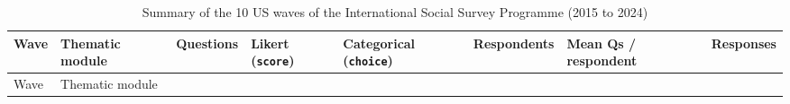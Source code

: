 \documentclass[
  11pt,
  letterpaper,
]{article}
\begin{document}
{\def\LTcaptype{apptbl}
\begin{longtable}[]{@{}
  >{\raggedright\arraybackslash}p{}
  >{\raggedright\arraybackslash}p{}
  >{\raggedleft\arraybackslash}p{}
  >{\raggedleft\arraybackslash}p{}
  >{\raggedleft\arraybackslash}p{}
  >{\raggedleft\arraybackslash}p{}
  >{\raggedleft\arraybackslash}p{}
  >{\raggedleft\arraybackslash}p{}@{}}
\caption{{\label{apptbl-issp-waves}}Summary of the 10 US waves of the
International Social Survey Programme (2015 to 2024)}\tabularnewline
\toprule\noalign{}
\begin{minipage}[b]{\linewidth}\raggedright
Wave
\end{minipage} & \begin{minipage}[b]{\linewidth}\raggedright
Thematic module
\end{minipage} & \begin{minipage}[b]{\linewidth}\raggedleft
Questions
\end{minipage} & \begin{minipage}[b]{\linewidth}\raggedleft
Likert (\texttt{score})
\end{minipage} & \begin{minipage}[b]{\linewidth}\raggedleft
Categorical (\texttt{choice})
\end{minipage} & \begin{minipage}[b]{\linewidth}\raggedleft
Respondents
\end{minipage} & \begin{minipage}[b]{\linewidth}\raggedleft
Mean Qs / respondent
\end{minipage} & \begin{minipage}[b]{\linewidth}\raggedleft
Responses
\end{minipage} \\
\midrule\noalign{}
\endfirsthead
\toprule\noalign{}
\begin{minipage}[b]{\linewidth}\raggedright
Wave
\end{minipage} & \begin{minipage}[b]{\linewidth}\raggedright
Thematic module
\end{minipage} & \begin{minipage}[b]{\linewidth}\raggedleft

\end{minipage}
\end{longtable}}
\end{document}
